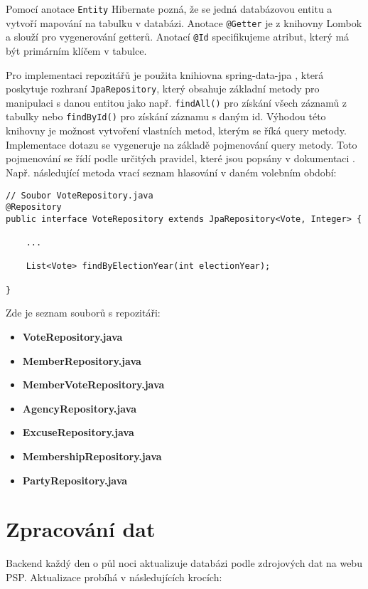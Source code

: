 Pomocí anotace \lstinline|Entity| Hibernate pozná, že se jedná databázovou entitu a vytvoří mapování na tabulku v databázi. Anotace \lstinline|@Getter| je z knihovny Lombok a slouží pro vygenerování getterů. Anotací \lstinline|@Id| specifikujeme atribut, který má být primárním klíčem v tabulce. 

Pro implementaci repozitářů je použita knihiovna spring-data-jpa \cite{spring-jpa}, která poskytuje rozhraní \lstinline|JpaRepository|, který obsahuje základní metody pro manipulaci s danou entitou jako \linebreak např. \lstinline|findAll()| pro získání všech záznamů z tabulky nebo \lstinline|findById()| pro získání záznamu s daným id. Výhodou této knihovny je možnost vytvoření vlastních metod, kterým se říká query metody. Implementace dotazu se vygeneruje na základě pojmenování query metody. Toto pojmenování se řídí podle určitých pravidel, které jsou popsány v dokumentaci \cite{spring-jpa}. Např. následující metoda vrací seznam hlasování v daném volebním období:

\begin{lstlisting}[caption={Repozitář pro hlasování}, label={lst:be-repository-vote}, tabsize=2]
// Soubor VoteRepository.java
@Repository
public interface VoteRepository extends JpaRepository<Vote, Integer> {
	
	...
	
	List<Vote> findByElectionYear(int electionYear);
	
}
\end{lstlisting}

\noindent Zde je seznam souborů s repozitáři:

\begin{itemize}
	\item \textbf{VoteRepository.java}
	\item \textbf{MemberRepository.java}
	\item \textbf{MemberVoteRepository.java}
	\item \textbf{AgencyRepository.java}
	\item \textbf{ExcuseRepository.java}
	\item \textbf{MembershipRepository.java}
	\item \textbf{PartyRepository.java}
\end{itemize}

\section{Zpracování dat}
Backend každý den o půl noci aktualizuje databázi podle zdrojových dat na webu PSP. Aktualizace probíhá v následujících krocích:

